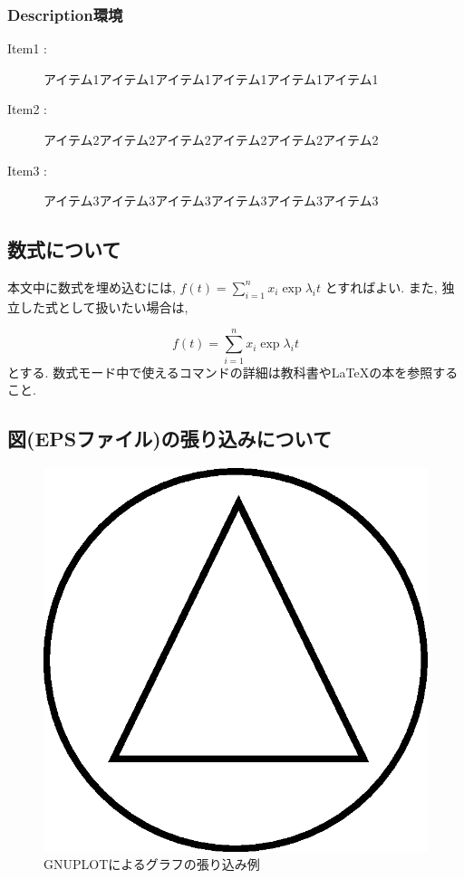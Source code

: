 \documentclass{jarticle}
\begin{document}
\subsubsection{Description環境}
%
\begin{description}

\item[Item1 : ] アイテム1アイテム1アイテム1アイテム1アイテム1アイテム1

\item[Item2 : ] アイテム2アイテム2アイテム2アイテム2アイテム2アイテム2

\item[Item3 : ] アイテム3アイテム3アイテム3アイテム3アイテム3アイテム3

\end{description}

\subsection{数式について}
%
本文中に数式を埋め込むには, $f(t) = \sum_{i=1}^{n} x_{i} \exp \lambda_{i} t$
とすればよい. 
また, 独立した式として扱いたい場合は, 

\begin{equation}
f(t) = \sum_{i=1}^{n} x_{i} \exp \lambda_{i} t
\end{equation}
%
とする. 数式モード中で使えるコマンドの詳細は教科書や{\LaTeX}の本を参照すること. 

\subsection{図(EPSファイル)の張り込みについて}
%
\begin{figure}
\begin{center}
\includegraphics[scale=0.30]{graph.eps}
\caption{GNUPLOTによるグラフの張り込み例}
\label{fig:graph}
\end{center}
\end{figure}
\end{document}
